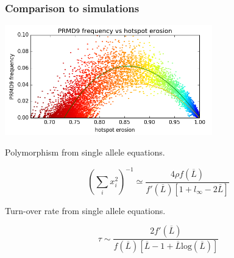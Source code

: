 \documentclass[10pt]{beamer}
\begin{document}
\begin{frame}
	\frametitle{Comparison to simulations}
	\begin{center}
       \includegraphics[width=9cm]{Images/results.png}
	\end{center}
\end{frame}

\begin{frame}
	\begin{center}
		\Large
    Polymorphism from single allele equations.
	\end{center}
\[
  \left( \sum_i x_i^2  \right)^{-1} \simeq 
  \dfrac{4 \rho f(\overline{L})}{f'(\overline{L})\left[ 1 + l_{\infty} - 2 \overline{L}  \right]}
\]
\end{frame}

\begin{frame}
	\begin{center}
		\Large
    Turn-over rate from single allele equations.
	\end{center}
\[
  \tau \sim \dfrac{2 f'(\overline{L})}{f(\overline{L})[\overline{L}-1 + \overline{L} \mathrm{log}(\overline{L})]}
\]
\end{frame}
\end{document}
